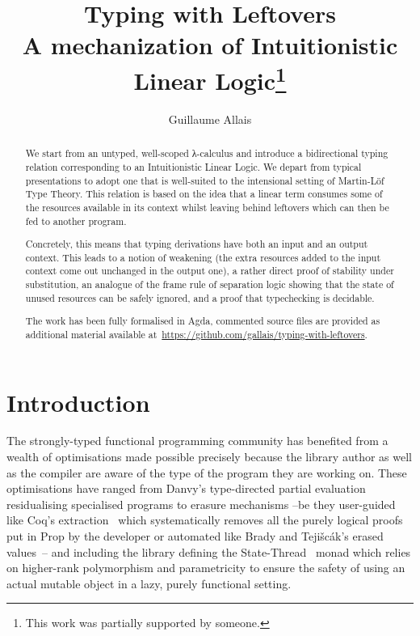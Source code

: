 \documentclass[a4paper,UKenglish]{lipics-v2016}
\title{Typing with Leftovers \protect\\
{\Large A mechanization of Intuitionistic Linear Logic\footnote{This work was partially supported by someone.}}}
\author[1]{Guillaume Allais}
\affil[1]{Nijmegen Quantum Logic Group ─ Radboud University\\
  \texttt{gallais@cs.ru.nl}}
\begin{document}
\maketitle

\begin{abstract}
We start from an untyped, well-scoped λ-calculus and introduce a bidirectional
typing relation corresponding to an Intuitionistic Linear Logic. We depart from
typical presentations to adopt one that is well-suited to the intensional setting
of Martin-Löf Type Theory. This relation is based on the idea that a linear term
consumes some of the resources available in its context whilst leaving behind
leftovers which can then be fed to another program.

Concretely, this means that typing derivations have both an input
and an output context. This leads to a notion of weakening (the extra
resources added to the input context come out unchanged in the output
one), a rather direct proof of stability under substitution, an
analogue of the frame rule of separation logic showing that the
state of unused resources can be safely ignored, and a proof that
typechecking is decidable.

The work has been fully formalised in Agda, commented source files
are provided as additional material available at~\url{https://github.com/gallais/typing-with-leftovers}.
\end{abstract}

\section{Introduction}

The strongly-typed functional programming community has benefited from
a wealth of optimisations made possible precisely because the library
author as well as the compiler are aware of the type of the program they
are working on. These optimisations have ranged from Danvy's type-directed
partial evaluation~\cite{Danvy1999Type} residualising specialised programs
to erasure mechanisms --be they user-guided like Coq's extraction~\cite{letouzey2002new}
which systematically removes all the purely logical proofs put in Prop by
the developer or automated like Brady and Teji{\v{s}}c{\'a}k's erased
values~\cite{brady2003inductive,bradypractical}-- and including the library
defining the State-Thread~\cite{launchbury1994lazy} monad which relies on
higher-rank polymorphism and parametricity to ensure the safety of using an
actual mutable object in a lazy, purely functional setting.
\end{document}
